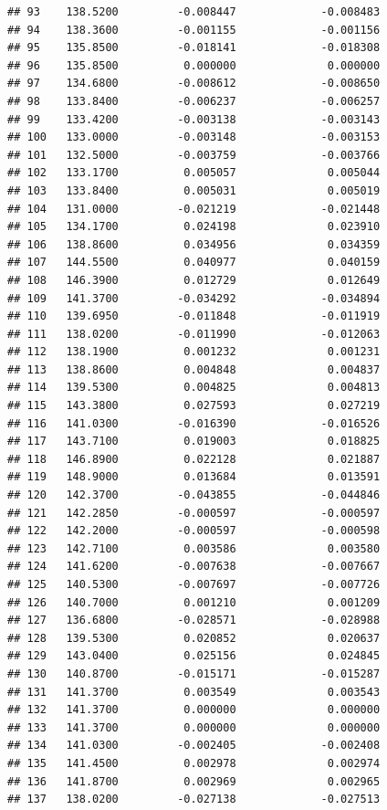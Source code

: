 \documentclass[
]{article}
\begin{document}
\begin{verbatim}
## 93    138.5200         -0.008447             -0.008483
## 94    138.3600         -0.001155             -0.001156
## 95    135.8500         -0.018141             -0.018308
## 96    135.8500          0.000000              0.000000
## 97    134.6800         -0.008612             -0.008650
## 98    133.8400         -0.006237             -0.006257
## 99    133.4200         -0.003138             -0.003143
## 100   133.0000         -0.003148             -0.003153
## 101   132.5000         -0.003759             -0.003766
## 102   133.1700          0.005057              0.005044
## 103   133.8400          0.005031              0.005019
## 104   131.0000         -0.021219             -0.021448
## 105   134.1700          0.024198              0.023910
## 106   138.8600          0.034956              0.034359
## 107   144.5500          0.040977              0.040159
## 108   146.3900          0.012729              0.012649
## 109   141.3700         -0.034292             -0.034894
## 110   139.6950         -0.011848             -0.011919
## 111   138.0200         -0.011990             -0.012063
## 112   138.1900          0.001232              0.001231
## 113   138.8600          0.004848              0.004837
## 114   139.5300          0.004825              0.004813
## 115   143.3800          0.027593              0.027219
## 116   141.0300         -0.016390             -0.016526
## 117   143.7100          0.019003              0.018825
## 118   146.8900          0.022128              0.021887
## 119   148.9000          0.013684              0.013591
## 120   142.3700         -0.043855             -0.044846
## 121   142.2850         -0.000597             -0.000597
## 122   142.2000         -0.000597             -0.000598
## 123   142.7100          0.003586              0.003580
## 124   141.6200         -0.007638             -0.007667
## 125   140.5300         -0.007697             -0.007726
## 126   140.7000          0.001210              0.001209
## 127   136.6800         -0.028571             -0.028988
## 128   139.5300          0.020852              0.020637
## 129   143.0400          0.025156              0.024845
## 130   140.8700         -0.015171             -0.015287
## 131   141.3700          0.003549              0.003543
## 132   141.3700          0.000000              0.000000
## 133   141.3700          0.000000              0.000000
## 134   141.0300         -0.002405             -0.002408
## 135   141.4500          0.002978              0.002974
## 136   141.8700          0.002969              0.002965
## 137   138.0200         -0.027138             -0.027513

\end{verbatim}
\end{document}
